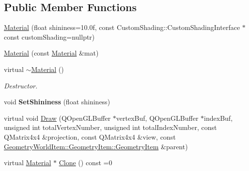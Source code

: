 \subsection*{Public Member Functions}
\begin{DoxyCompactItemize}
\item 
\mbox{\hyperlink{class_geometry_engine_1_1_geometry_material_1_1_material_a9d60d29295dd7dd26158dce1a90cf838}{Material}} (float shininess=10.\+0f, const Custom\+Shading\+::\+Custom\+Shading\+Interface $\ast$const custom\+Shading=nullptr)
\item 
\mbox{\hyperlink{class_geometry_engine_1_1_geometry_material_1_1_material_a18c3bbd40d6c410c9c8ca9dfc36f15ee}{Material}} (const \mbox{\hyperlink{class_geometry_engine_1_1_geometry_material_1_1_material}{Material}} \&mat)
\item 
\mbox{\label{class_geometry_engine_1_1_geometry_material_1_1_material_a55a707060a08e18b45c7ea3f0ec64704}} 
virtual \mbox{\hyperlink{class_geometry_engine_1_1_geometry_material_1_1_material_a55a707060a08e18b45c7ea3f0ec64704}{$\sim$\+Material}} ()
\begin{DoxyCompactList}\small\item\em Destructor. \end{DoxyCompactList}\item 
\mbox{\label{class_geometry_engine_1_1_geometry_material_1_1_material_a2b3269750da169f6228f78beac202bac}} 
void {\bfseries Set\+Shininess} (float shininess)
\item 
virtual void \mbox{\hyperlink{class_geometry_engine_1_1_geometry_material_1_1_material_ae337c74e4f500d0a881779c2c3495908}{Draw}} (Q\+Open\+G\+L\+Buffer $\ast$vertex\+Buf, Q\+Open\+G\+L\+Buffer $\ast$index\+Buf, unsigned int total\+Vertex\+Number, unsigned int total\+Index\+Number, const Q\+Matrix4x4 \&projection, const Q\+Matrix4x4 \&view, const \mbox{\hyperlink{class_geometry_engine_1_1_geometry_world_item_1_1_geometry_item_1_1_geometry_item}{Geometry\+World\+Item\+::\+Geometry\+Item\+::\+Geometry\+Item}} \&parent)
\item 
virtual \mbox{\hyperlink{class_geometry_engine_1_1_geometry_material_1_1_material}{Material}} $\ast$ \mbox{\hyperlink{class_geometry_engine_1_1_geometry_material_1_1_material_ae5513ff06d536365e18ddc5e07e79784}{Clone}} () const =0
\item 

\end{DoxyCompactItemize}
